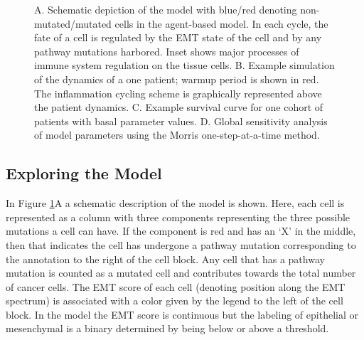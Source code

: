 \documentclass{article}
\begin{document}
\begin{figure}[H]
\center
{}
\caption{A. Schematic depiction of the model with blue/red denoting non-mutated/mutated cells in the agent-based model. In each cycle, the fate of a cell is regulated by the EMT state of the cell and by any pathway mutations harbored. Inset shows major processes of immune system regulation on the tissue cells.
B. Example simulation of the dynamics of a one patient; warmup period is shown in red.
The inflammation cycling scheme is graphically represented above the patient dynamics.
C. Example survival curve for one cohort of patients with basal parameter values.
D. Global sensitivity analysis of model parameters using the Morris one-step-at-a-time method.}
\label{fig:ModelIntro}
\end{figure}

\subsection{Exploring the Model}\label{ExplModel}
In Figure \ref{fig:ModelIntro}A a schematic description of the model is shown.
Here, each cell is represented as a column with three components representing the three possible mutations a cell can have.
If the component is red and has an `X' in the middle, then that indicates the cell has undergone a pathway mutation corresponding to the annotation to the right of the cell block.
Any cell that has a pathway mutation is counted as a mutated cell and contributes towards the total number of cancer cells.
The EMT score of each cell (denoting position along the EMT spectrum) is associated with a color given by the legend to the left of the cell block. 
In the model the EMT score is continuous but the labeling of epithelial or mesenchymal is a binary determined by being below or above a threshold.
\end{document}
